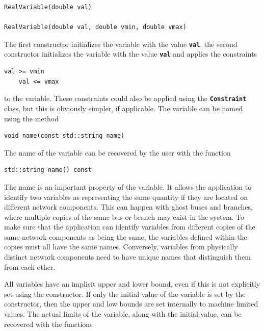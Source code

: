 \documentclass[12pt]{report} %
\begin{document}
{
\color{red}
\begin{Verbatim}[fontseries=b]
RealVariable(double val)

RealVariable(double val, double vmin, double vmax)
\end{Verbatim}
}

The first constructor initializes the variable with the value \texttt{\textbf{val}}, the second constructor initializes the variable with the value \texttt{\textbf{val}} and applies the constraints

{
\color{red}
\begin{Verbatim}[fontseries=b]
    val >= vmin
    val <= vmax
\end{Verbatim}
}

to the variable. These constraints could also be applied using the \texttt{\textbf{Constraint}} class, but this is obviously simpler, if applicable. The variable can be named using the method

{
\color{red}
\begin{Verbatim}[fontseries=b]
void name(const std::string name)
\end{Verbatim}
}

The name of the variable can be recovered by the user with the function

{
\color{red}
\begin{Verbatim}[fontseries=b]
std::string name() const
\end{Verbatim}
}

The name is an important property of the variable. It allows the application to identify two variables as representing the same quantity if they are located on different network components. This can happen with ghost buses and branches, where multiple copies of the same bus or branch may exist in the system. To make sure that the application can identify variables from different copies of the same network components as being the same, the variables defined within the copies must all have the same names. Conversely, variables from physically distinct network components need to have unique names that distinguish them from each other.

All variables have an implicit upper and lower bound, even if this is not explicitly set using the constructor. If only the initial value of the variable is set by the constructor, then the upper and low bounds are set internally to machine limited values. The actual limits of the variable, along with the initial value, can be recovered with the functions
\end{document}
